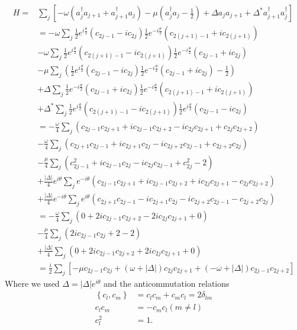 \begin{align}
    H =& \sum_j\left[ - \omega \left(a_j^\dagger a_{j+1} + a_{j+1}^\dagger a_j  \right) - \mu \left(a_j^\dagger  a_j - \frac{1}{2} \right) + \Delta a_j a_{j+1} + \Delta^* a_{j+1}^\dagger a_j^\dagger \right]\\
    &= -\omega \sum_j  \frac{1}{2} e^{i \frac{\theta}{2}} \left( c_{2j-1} - i c_{2j}  \right) \frac{1}{2} e^{-i \frac{\theta}{2}} \left( c_{2(j+1)-1} + i c_{2(j+1)} \right) \\
    &-\omega \sum_j \frac{1}{2} e^{i \frac{\theta}{2}} \left( c_{2(j+1)-1} - i c_{2(j+1)}  \right) \frac{1}{2} e^{-i \frac{\theta}{2}} \left( c_{2j-1} + i c_{2j} \right)\\
    &- \mu \sum_j \left(\frac{1}{2} e^{i \frac{\theta}{2}} \left( c_{2j-1} - i c_{2j}  \right) \frac{1}{2} e^{-i \frac{\theta}{2}} \left( c_{2j-1} + i c_{2j} \right)  - \frac{1}{2}\right) \\
    &+ \Delta \sum_j \frac{1}{2} e^{-i \frac{\theta}{2}} \left( c_{2j-1} + i c_{2j} \right) \frac{1}{2} e^{-i \frac{\theta}{2}} \left( c_{2(j+1)-1} + i c_{2(j+1)} \right) \\
    &+ \Delta^* \sum_j \frac{1}{2} e^{i \frac{\theta}{2}} \left( c_{2(j+1)-1} - i c_{2(j+1)}  \right) \frac{1}{2} e^{i \frac{\theta}{2}} \left( c_{2j-1} - i c_{2j}  \right)\\
    &= - \frac{\omega}{4} \sum_j \left( c_{2j-1} c_{2j + 1} + i c_{2j-1} c_{2j + 2} - i c_{2j} c_{2j + 1} + c_{2j} c_{2j + 2} \right) \\
    &- \frac{\omega}{4} \sum_j \left( c_{2j+1} c_{2j - 1} + i c_{2j + 1} c_{2j} - i c_{2j + 2} c_{2j - 1} + c_{2j + 2} c_{2j}\right)\\
    & -\frac{\mu}{4} \sum_j \left( c_{2j-1}^2 + ic_{2j-1} c_{2j} - i c_{2j} c_{2j-1} + c_{2j}^2 - 2 \right) \\
    &+ \frac{|\Delta|}{4}e^{i\theta} \sum_j e^{-i \theta} \left( c_{2j-1} c_{2j+1} + i c_{2j-1} c_{2j+2} + i c_{2j} c_{2j+1} - c_{2j} c_{2j+2} \right) \\
    &+ \frac{|\Delta|}{4} e^{-i\theta} \sum_j e^{i\theta}\left( c_{2j+1} c_{2j-1} - i c_{2j + 1} c_{2j} - i c_{2j+2} c_{2j-1} - c_{2j+2} c_{2j}\right) \\
    &= - \frac{\omega}{4} \sum_j \left( 0 + 2 i c_{2j-1} c_{2j+2} - 2i c_{2j}c_{2j+1} + 0\right) \\
    &- \frac{\mu}{4} \sum_j \left( 2i c_{2j-1}c_{2j} + 2 - 2\right)\\
    &+ \frac{|\Delta|}{4}\sum_j \left( 0 + 2i c_{2j-1}c_{2j+2} + 2i c_{2j} c_{2j+1} + 0  \right) \\
    &= \frac{i}{2} \sum_j \left[-\mu c_{2j-1} c_{2j} + \left(\omega + \left|\Delta \right|  \right) c_{2j} c_{2j+1} + \left(-\omega + \left| \Delta \right| \right) c_{2j-1} c_{2j+2} \right]
\end{align}
Where we used $\Delta = |\Delta|e^{i\theta}$ and the anticommutation relations
\begin{align}
    \left\{ c_l, c_m \right\} &= c_l c_m + c_m c_l = 2\delta_{lm} \\
    c_l c_m &= - c_m c_l (m \neq l)\\
    c_l^2 &= 1.
\end{align}

